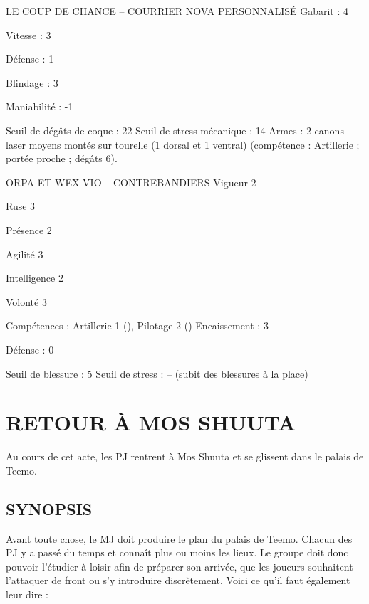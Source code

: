 \documentclass[a4paper,10pt,twoside,twocolumn,openany]{book}
\begin{document}
\begin{monsterbox}


LE COUP DE CHANCE –
COURRIER NOVA PERSONNALISÉ
Gabarit : 4

Vitesse : 3

Défense : 1

Blindage : 3

Maniabilité : -1

Seuil de dégâts de coque : 22
Seuil de stress mécanique : 14
Armes : 2 canons laser moyens montés sur tourelle (1 dorsal et 1 ventral) (compétence : Artillerie ; portée proche ; dégâts 6).
\end{monsterbox}
\begin{monsterbox}

ORPA ET WEX VIO – CONTREBANDIERS
Vigueur 2

Ruse 3

Présence 2

Agilité 3

Intelligence 2

Volonté 3

Compétences : Artillerie 1 (\difficulty \difficulty \proficiency), Pilotage 2
(\difficulty \proficiency \proficiency)
Encaissement : 3

Défense : 0

Seuil de blessure : 5
Seuil de stress : – (subit des blessures à la place)
\end{monsterbox}


\chapter{RETOUR À MOS SHUUTA}

Au cours de cet acte, les PJ rentrent à Mos Shuuta et se
glissent dans le palais de Teemo.

\section{SYNOPSIS}

Avant toute chose, le MJ doit produire le plan du palais de Teemo. Chacun des PJ y a passé du temps et
connaît plus ou moins les lieux. Le groupe doit donc
pouvoir l’étudier à loisir afin de préparer son arrivée,
que les joueurs souhaitent l’attaquer de front ou s’y
introduire discrètement. Voici ce qu’il faut également
leur dire :
\end{document}
